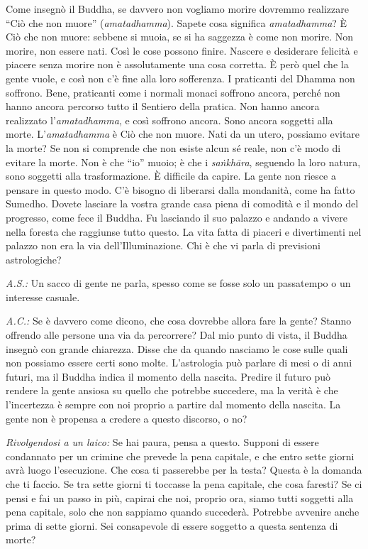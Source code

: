 Come insegnò il Buddha, se davvero non vogliamo morire dovremmo
realizzare ``Ciò che non muore'' (\emph{amatadhamma}). Sapete cosa
significa \emph{amatadhamma}? È Ciò che non muore: sebbene si muoia, se
si ha saggezza è come non morire. Non morire, non essere nati. Così le
cose possono finire. Nascere e desiderare felicità e piacere senza
morire non è assolutamente una cosa corretta. È però quel che la gente
vuole, e così non c'è fine alla loro sofferenza. I praticanti del Dhamma
non soffrono. Bene, praticanti come i normali monaci soffrono ancora,
perché non hanno ancora percorso tutto il Sentiero della pratica. Non
hanno ancora realizzato l'\emph{amatadhamma}, e così soffrono ancora.
Sono ancora soggetti alla morte. L'\emph{amatadhamma} è Ciò che non
muore. Nati da un utero, possiamo evitare la morte? Se non si comprende
che non esiste alcun sé reale, non c'è modo di evitare la morte. Non è
che ``io'' muoio; è che i \emph{saṅkhāra}, seguendo la loro natura, sono
soggetti alla trasformazione. È difficile da capire. La gente non riesce
a pensare in questo modo. C'è bisogno di liberarsi dalla mondanità, come
ha fatto Sumedho. Dovete lasciare la vostra grande casa piena di
comodità e il mondo del progresso, come fece il Buddha. Fu lasciando il
suo palazzo e andando a vivere nella foresta che raggiunse tutto questo.
La vita fatta di piaceri e divertimenti nel palazzo non era la via
dell'Illuminazione. Chi è che vi parla di previsioni astrologiche?

\emph{A.S.:} Un sacco di gente ne parla, spesso come se fosse solo un
passatempo o un interesse casuale.

\emph{A.C.:} Se è davvero come dicono, che cosa dovrebbe allora fare la gente?
Stanno offrendo alle persone una via da percorrere? Dal mio punto di
vista, il Buddha insegnò con grande chiarezza. Disse che da quando
nasciamo le cose sulle quali non possiamo essere certi sono molte.
L'astrologia può parlare di mesi o di anni futuri, ma il Buddha indica
il momento della nascita. Predire il futuro può rendere la gente ansiosa
su quello che potrebbe succedere, ma la verità è che l'incertezza è
sempre con noi proprio a partire dal momento della nascita. La gente non
è propensa a credere a questo discorso, o no?

\emph{Rivolgendosi a un laico:} Se hai paura, pensa a questo. Supponi di
essere condannato per un crimine che prevede la pena capitale, e che
entro sette giorni avrà luogo l'esecuzione. Che cosa ti passerebbe per
la testa? Questa è la domanda che ti faccio. Se tra sette giorni ti
toccasse la pena capitale, che cosa faresti? Se ci pensi e fai un passo
in più, capirai che noi, proprio ora, siamo tutti soggetti alla pena
capitale, solo che non sappiamo quando succederà. Potrebbe avvenire
anche prima di sette giorni. Sei consapevole di essere soggetto a questa
sentenza di morte?

